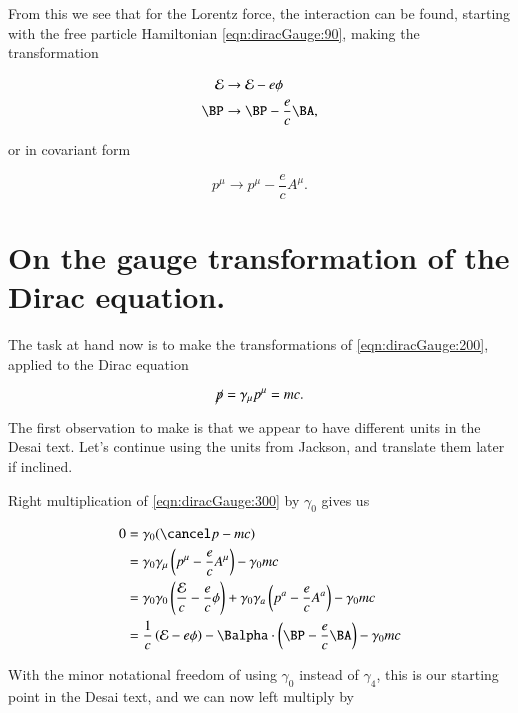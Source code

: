 From this we see that for the Lorentz force, the interaction can be found, starting with the free particle Hamiltonian \ref{eqn:diracGauge:90}, making the transformation

\begin{subequations}
\label{eqn:diracGauge:200}
\begin{align}
\mathcal{E}   &\rightarrow \mathcal{E} - e\phi \\
\BP &\rightarrow \BP - \frac{e}{c}\BA,
\end{align}
\end{subequations}

or in covariant form

\begin{equation}\label{eqn:diracGauge:210}
p^\mu \rightarrow p^\mu - \frac{e}{c}A^\mu.
\end{equation}

\section{On the gauge transformation of the Dirac equation.}

The task at hand now is to make the transformations of \ref{eqn:diracGauge:200}, applied to the Dirac equation

\begin{equation}\label{eqn:diracGauge:300}
\cancel{p} = \gamma_\mu p^\mu = m c.
\end{equation}

The first observation to make is that we appear to have different units in the Desai text.  Let's continue using the units from Jackson, and translate them later if inclined.

Right multiplication of \ref{eqn:diracGauge:300} by $\gamma_0$ gives us

\begin{align*}
0 &= \gamma_0 (\pslash - m c) \\
  &= \gamma_0 \gamma_\mu \left( p^\mu - \frac{e}{c} A^\mu \right)
- \gamma_0 m c
\\
  &=
\gamma_0 \gamma_0 \left(\frac{\mathcal{E}}{c} - \frac{e}{c} \phi \right)
+\gamma_0 \gamma_a \left(p^a - \frac{e}{c} A^a \right)
- \gamma_0 m c \\
  &=
\inv{c} \left( \mathcal{E}- e \phi \right)
-\Balpha \cdot \left(\BP - \frac{e}{c} \BA \right)
- \gamma_0 m c \\
\end{align*}

With the minor notational freedom of using $\gamma_0$ instead of $\gamma_4$, this is our starting point in the Desai text, and we can now left multiply by

